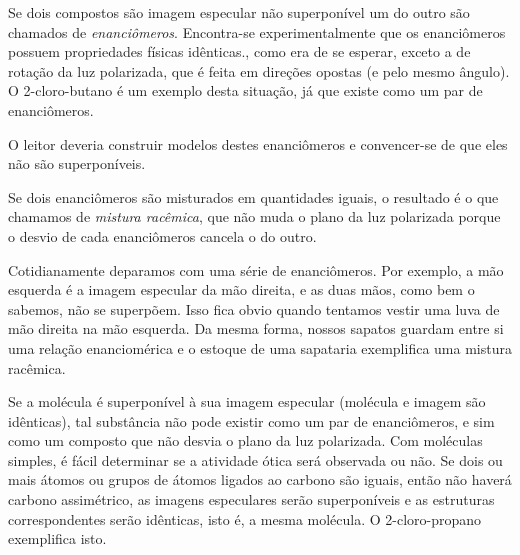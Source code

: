 Se dois compostos são imagem especular não superponível um do outro são chamados de \textit{enanciômeros}. Encontra-se experimentalmente que os enanciômeros possuem propriedades físicas idênticas., como era de se esperar, exceto a de rotação da luz polarizada, que é feita em direções opostas (e pelo mesmo ângulo). O 2-cloro-butano é um exemplo desta situação, já que existe como um par de enanciômeros.

\begin{figure}[H]
    \centering
\end{figure}

\noindent O leitor deveria construir modelos destes enanciômeros e convencer-se de que eles não são superponíveis.

Se dois enanciômeros são misturados em quantidades iguais, o resultado é o que chamamos de \textit{mistura racêmica}, que não muda o plano da luz polarizada porque o desvio de cada enanciômeros cancela o do outro. 

Cotidianamente deparamos com uma série de enanciômeros. Por exemplo, a mão esquerda é a imagem especular da mão direita, e as duas mãos, como bem o sabemos, não se superpõem. Isso fica obvio quando tentamos vestir uma luva de mão direita na mão esquerda. Da mesma forma, nossos sapatos guardam entre si uma relação enanciomérica e o estoque de uma sapataria exemplifica uma mistura racêmica.

Se a molécula é superponível à sua imagem especular (molécula e imagem são idênticas), tal substância não pode existir como um par de enanciômeros, e sim como um composto que não desvia o plano da luz polarizada. Com moléculas simples, é fácil determinar se a atividade ótica será observada ou não. Se dois ou mais átomos ou grupos de átomos ligados ao carbono são iguais, então não haverá carbono assimétrico, as imagens especulares serão superponíveis e as estruturas correspondentes serão idênticas, isto é, a mesma molécula. O 2-cloro-propano exemplifica isto.

